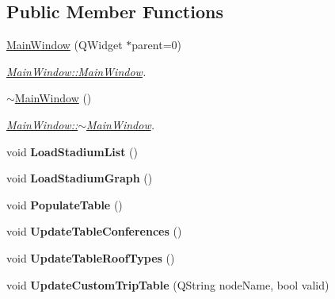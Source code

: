 \subsection*{Public Member Functions}
\begin{DoxyCompactItemize}
\item 
\mbox{\hyperlink{class_main_window_a8b244be8b7b7db1b08de2a2acb9409db}{Main\+Window}} (Q\+Widget $\ast$parent=0)
\begin{DoxyCompactList}\small\item\em \mbox{\hyperlink{class_main_window_a8b244be8b7b7db1b08de2a2acb9409db}{Main\+Window\+::\+Main\+Window}}. \end{DoxyCompactList}\item 
\mbox{\label{class_main_window_ae98d00a93bc118200eeef9f9bba1dba7}} 
\mbox{\hyperlink{class_main_window_ae98d00a93bc118200eeef9f9bba1dba7}{$\sim$\+Main\+Window}} ()
\begin{DoxyCompactList}\small\item\em \mbox{\hyperlink{class_main_window_ae98d00a93bc118200eeef9f9bba1dba7}{Main\+Window\+::$\sim$\+Main\+Window}}. \end{DoxyCompactList}\item 
\mbox{\label{class_main_window_afd74441a225bb4ec71795a08dea80c52}} 
void {\bfseries Load\+Stadium\+List} ()
\item 
\mbox{\label{class_main_window_a4d5a7c437593a4cc79659e886e2aeb1d}} 
void {\bfseries Load\+Stadium\+Graph} ()
\item 
\mbox{\label{class_main_window_aa956d021cb1de86e66b8aebfd2b12bbb}} 
void {\bfseries Populate\+Table} ()
\item 
\mbox{\label{class_main_window_ac332c4edeac0bc6a9bb94f142c362b5f}} 
void {\bfseries Update\+Table\+Conferences} ()
\item 
\mbox{\label{class_main_window_a1981d9de67b6f6cc2e0671831efbdf01}} 
void {\bfseries Update\+Table\+Roof\+Types} ()
\item 
\mbox{\label{class_main_window_a57fc01cf6d6d5de89d4cab95c295ba7f}} 
void {\bfseries Update\+Custom\+Trip\+Table} (Q\+String node\+Name, bool valid)

\end{DoxyCompactItemize}

